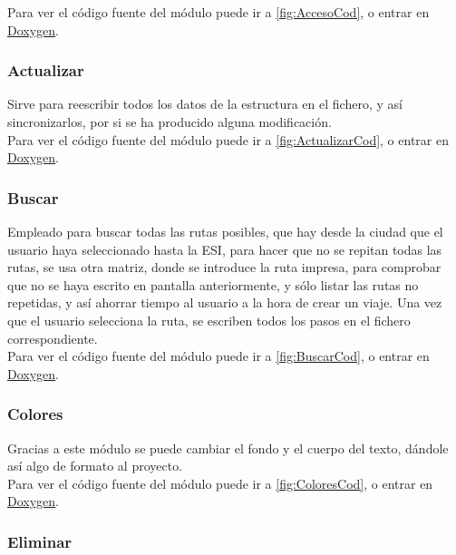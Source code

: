 Para ver el código fuente del módulo puede ir a \ref{fig:AccesoCod}, o entrar en \href{DOC_DOXYGEN/acceso_8h_source.html}{Doxygen}.
\label{fig:Acceso}

\subsubsection{Actualizar}

Sirve para reescribir todos los datos de la estructura en el fichero, y así sincronizarlos, por si se ha producido alguna modificación.\\

Para ver el código fuente del módulo puede ir a \ref{fig:ActualizarCod}, o entrar en \href{DOC_DOXYGEN/actualizar_8h_source.html}{Doxygen}.
\label{fig:Actualizar}

\subsubsection{Buscar}

Empleado para buscar todas las rutas posibles, que hay desde la ciudad que el usuario haya seleccionado
hasta la ESI, para hacer que no se repitan todas las rutas, se usa otra matriz, donde se introduce la ruta impresa, para comprobar que no se haya escrito en pantalla anteriormente,
y sólo listar las rutas no repetidas, y así ahorrar tiempo al usuario a la hora de crear un viaje. Una vez que el usuario selecciona la ruta, se escriben
todos los pasos en el fichero correspondiente.\\

Para ver el código fuente del módulo puede ir a \ref{fig:BuscarCod}, o entrar en \href{DOC_DOXYGEN/buscar_8h_source.html}{Doxygen}.
\label{fig:Buscar}

\subsubsection{Colores}

Gracias a este módulo se puede cambiar el fondo y el cuerpo del texto, dándole así algo de formato al proyecto.\\

Para ver el código fuente del módulo puede ir a \ref{fig:ColoresCod}, o entrar en \href{DOC_DOXYGEN/colores_8h_source.html}{Doxygen}.
\label{fig:Colores}

\subsubsection{Eliminar}

